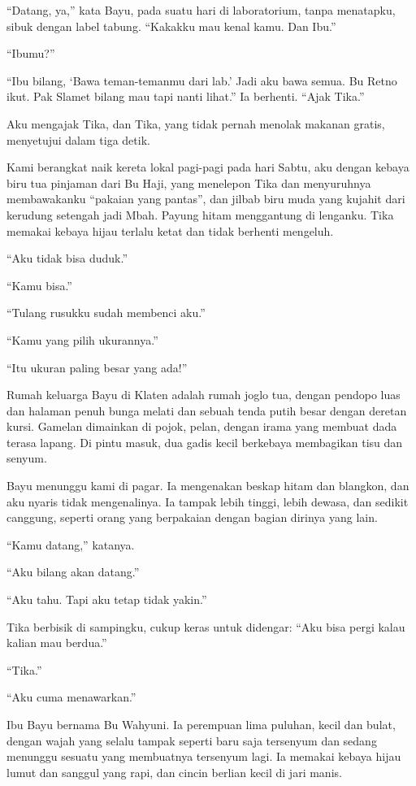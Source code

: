\documentclass[11pt,twoside,openany]{book}
\makeatletter
\newcommand{\scenebreak}{\par\vspace{0.9em}{\centering\textsc{*\hspace{0.7em}*\hspace{0.7em}*}\par}\vspace{0.9em}\@afterindentfalse\@afterheading}
\makeatother
\begin{document}
``Datang, ya,'' kata Bayu, pada suatu hari di laboratorium, tanpa menatapku, sibuk dengan label tabung. ``Kakakku mau kenal kamu. Dan Ibu.''

``Ibumu?''

``Ibu bilang, `Bawa teman-temanmu dari lab.' Jadi aku bawa semua. Bu Retno ikut. Pak Slamet bilang mau tapi nanti lihat.'' Ia berhenti. ``Ajak Tika.''

Aku mengajak Tika, dan Tika, yang tidak pernah menolak makanan gratis, menyetujui dalam tiga detik.

Kami berangkat naik kereta lokal pagi-pagi pada hari Sabtu, aku dengan kebaya biru tua pinjaman dari Bu Haji, yang menelepon Tika dan menyuruhnya membawakanku ``pakaian yang pantas'', dan jilbab biru muda yang kujahit dari kerudung setengah jadi Mbah. Payung hitam menggantung di lenganku. Tika memakai kebaya hijau terlalu ketat dan tidak berhenti mengeluh.

``Aku tidak bisa duduk.''

``Kamu bisa.''

``Tulang rusukku sudah membenci aku.''

``Kamu yang pilih ukurannya.''

``Itu ukuran paling besar yang ada!''

Rumah keluarga Bayu di Klaten adalah rumah joglo tua, dengan pendopo luas dan halaman penuh bunga melati dan sebuah tenda putih besar dengan deretan kursi. Gamelan dimainkan di pojok, pelan, dengan irama yang membuat dada terasa lapang. Di pintu masuk, dua gadis kecil berkebaya membagikan tisu dan senyum.

Bayu menunggu kami di pagar. Ia mengenakan beskap hitam dan blangkon, dan aku nyaris tidak mengenalinya. Ia tampak lebih tinggi, lebih dewasa, dan sedikit canggung, seperti orang yang berpakaian dengan bagian dirinya yang lain.

``Kamu datang,'' katanya.

``Aku bilang akan datang.''

``Aku tahu. Tapi aku tetap tidak yakin.''

Tika berbisik di sampingku, cukup keras untuk didengar: ``Aku bisa pergi kalau kalian mau berdua.''

``Tika.''

``Aku cuma menawarkan.''

\scenebreak
Ibu Bayu bernama Bu Wahyuni. Ia perempuan lima puluhan, kecil dan bulat, dengan wajah yang selalu tampak seperti baru saja tersenyum dan sedang menunggu sesuatu yang membuatnya tersenyum lagi. Ia memakai kebaya hijau lumut dan sanggul yang rapi, dan cincin berlian kecil di jari manis.
\end{document}

